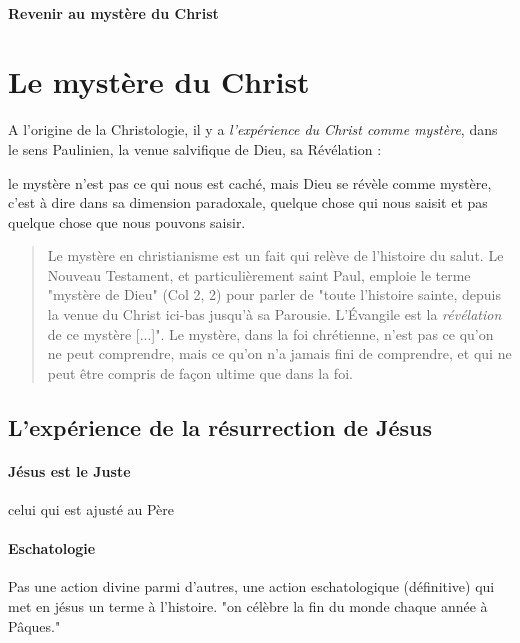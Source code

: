   \paragraph{Revenir au mystère du Christ}
  \section{Le mystère du Christ }

A l'origine de la Christologie, il y a \textit{l'expérience du Christ comme mystère}, dans le sens Paulinien, la venue salvifique de Dieu, sa Révélation : 

  
  \begin{Def}[mystère]
  le mystère n'est pas ce qui nous est caché, mais Dieu se révèle comme mystère, c'est à dire dans sa dimension paradoxale, quelque chose qui nous saisit et pas quelque chose que nous pouvons saisir.
  \end{Def}
   \begin{quote}
       Le mystère en christianisme est un fait qui relève de l'histoire du salut. Le Nouveau Testament, et particulièrement saint Paul, emploie le terme "mystère de Dieu" (Col 2, 2) pour parler de "toute l'histoire sainte, depuis la venue du Christ ici-bas jusqu'à sa Parousie. L’Évangile est la \textit{révélation} de ce mystère [...]". Le mystère, dans la foi chrétienne, n'est pas ce qu'on ne peut comprendre, mais ce qu'on n'a jamais fini de comprendre, et qui ne peut être compris de façon ultime que dans la foi. 
   \end{quote}
    
\subsection{L'expérience de la résurrection de Jésus}
    
    \paragraph{Jésus est le Juste} celui qui est ajusté au Père
    
    \paragraph{Eschatologie} Pas une action divine parmi d'autres, une action eschatologique (définitive) qui met en jésus un terme à l'histoire. "on célèbre la fin du monde chaque année à Pâques." 
